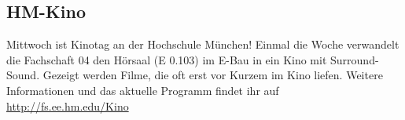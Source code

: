 \subsection{HM-Kino}
Mittwoch ist Kinotag an der Hochschule München! \doublebreak
Einmal die Woche verwandelt die Fachschaft 04 den Hörsaal (E 0.103) 
im E-Bau in ein Kino mit Surround-Sound. Gezeigt werden Filme, die oft 
erst vor Kurzem im Kino liefen. \doublebreak
Weitere Informationen und das aktuelle Programm findet ihr auf 
\url{http://fs.ee.hm.edu/Kino}